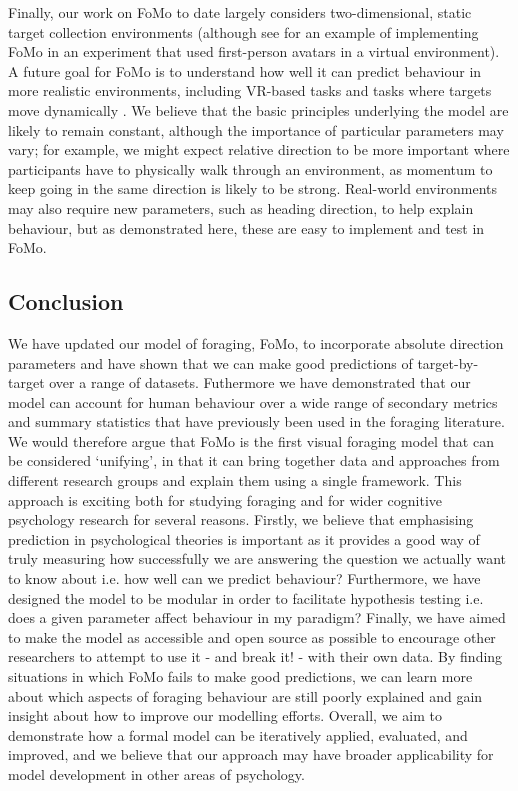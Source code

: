 \documentclass[man, floatsintext]{apa7}
\begin{document}
Finally, our work on FoMo to date largely considers two-dimensional, static target collection environments (although see \cite{bhat2026information} for an example of implementing FoMo in an experiment that used first-person avatars in a virtual environment). A future goal for FoMo is to understand how well it can predict behaviour in more realistic environments, including VR-based tasks \citep{kristjansson2022moving} and tasks where targets move dynamically \citep{grossle2023testing}. We believe that the basic principles underlying the model are likely to remain constant, although the importance of particular parameters may vary; for example, we might expect relative direction to be more important where participants have to physically walk through an environment, as momentum to keep going in the same direction is likely to be strong. Real-world environments may also require new parameters, such as heading direction, to help explain behaviour, but as demonstrated here, these are easy to implement and test in FoMo.

\subsection{Conclusion}

We have updated our model of foraging, FoMo, to incorporate absolute direction parameters and have shown that we can make good predictions of target-by-target over a range of datasets. Futhermore we have demonstrated that our model can account for human behaviour over a wide range of secondary metrics and summary statistics that have previously been used in the foraging literature. We would therefore argue that FoMo is the first visual foraging model that can be considered `unifying', in that it can bring together data and approaches from different research groups and explain them using a single framework. This approach is exciting both for studying foraging and for wider cognitive psychology research for several reasons. Firstly, we believe that emphasising prediction in psychological theories is important as it provides a good way of truly measuring how successfully we are answering the question we actually want to know about i.e. how well can we predict behaviour? Furthermore, we have designed the model to be modular in order to facilitate hypothesis testing i.e. does a given parameter affect behaviour in my paradigm? Finally, we have aimed to make the model as accessible and open source as possible to encourage other researchers to attempt to use it - and break it! - with their own data. By finding situations in which FoMo fails to make good predictions, we can learn more about which aspects of foraging behaviour are still poorly explained and gain insight about how to improve our modelling efforts. Overall, we aim to demonstrate how a formal model can be iteratively applied, evaluated, and improved, and we believe that our approach may have broader applicability for model development in other areas of psychology.
\end{document}
